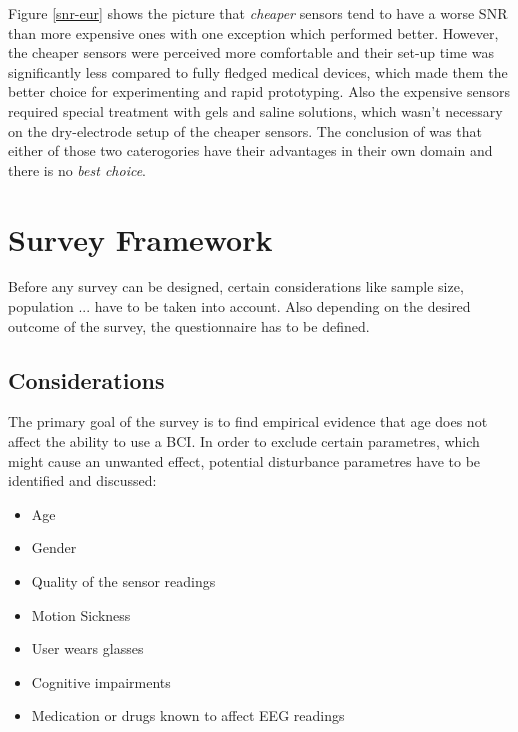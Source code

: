             Figure \ref{snr-eur} shows the picture that \textit{cheaper} sensors tend to have a worse SNR than more expensive ones with one exception which performed better. However, the cheaper sensors were perceived more comfortable and their set-up time was significantly less compared to fully fledged medical devices, which made them the better choice for experimenting and rapid prototyping. Also the expensive sensors required special treatment with gels and saline solutions, which wasn't necessary on the dry-electrode setup of the cheaper sensors. The conclusion of \cite{Zerafa.2018} was that either of those two caterogories have their advantages in their own domain and there is no \textit{best choice}.

            \medskip


    \chapter{Survey Framework}\label{survey-framework}

        Before any survey can be designed, certain considerations like sample size, population ... 
        have to be taken into account. Also depending on the desired outcome of the survey, the questionnaire has to be defined.

        \section{Considerations}\label{considerations}

            The primary goal of the survey is to find empirical evidence that age does not affect the ability to use a BCI. In order to exclude certain parametres, which might cause an unwanted effect, potential disturbance parametres have to be identified and discussed:

            \begin{itemize}
                \item Age
                \item Gender
                \item Quality of the sensor readings
                \item Motion Sickness
                \item User wears glasses
                \item Cognitive impairments
                \item Medication or drugs known to affect EEG readings
            \end{itemize}

